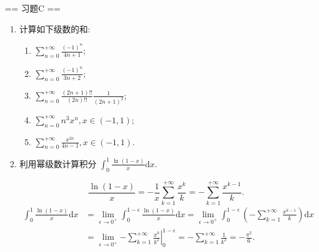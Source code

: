 == 习题C ==

\begin{enumerate}
    \item[1.]计算如下级数的和:
    \begin{enumerate}
        \item[(a)]$\displaystyle \sum_{n = 0}^{+\infty}\frac{(-1)^{n}}{4n + 1}$;
        \item[(b)]$\displaystyle \sum_{n = 0}^{+\infty}\frac{(-1)^{n}}{3n + 2}$;
        \item[(c)]$\displaystyle \sum_{n = 0}^{+\infty}\frac{(2n + 1)!!}{(2n)!!}\frac{1}{(2n + 1)^{2}}$;
        \item[(d)]$\displaystyle \sum_{n = 0}^{+\infty}n^{3}x^{n},x\in (-1,1)$;
        \item[(e)]$\displaystyle \sum_{n = 0}^{+\infty}\frac{x^{2n}}{4n - 1}, x\in (-1,1).$
    \end{enumerate}

    \item[2.]利用幂级数计算积分 \(\displaystyle \int_{0}^{1}\frac{\ln(1 - x)}{x} \mathrm{d}x.\)
    \begin{solution}
        \[
            \frac{\ln(1-x)}{x}=-\frac{1}{x}\sum_{k=1}^{+\infty}\frac{x^k}{k}=-\sum_{k=1}^{+\infty}\frac{x^{k-1}}{k}.
        \]
        \[
            \begin{aligned}
                \int_0^1\frac{\ln(1-x)}{x}\mathrm{d}x
                &=\lim_{\epsilon\to0^+}\int_0^{1-\epsilon}\frac{\ln(1-x)}{x}\mathrm{d}x =\lim_{\epsilon\to0^+}\int_0^{1-\epsilon}\left( -\sum_{k=1}^{+\infty}\frac{x^{k-1}}{k} \right)\mathrm{d}x\\
                &=\lim_{\epsilon\to0^+}\left.-\sum_{k=1}^{+\infty}\frac{x^{k}}{k^2}\right|_0^{1-\epsilon} =-\sum_{k=1}^{+\infty}\frac{1}{k^2}=-\frac{\pi^2}{6}.
            \end{aligned}
        \]
    \end{solution}
    

\end{enumerate}
